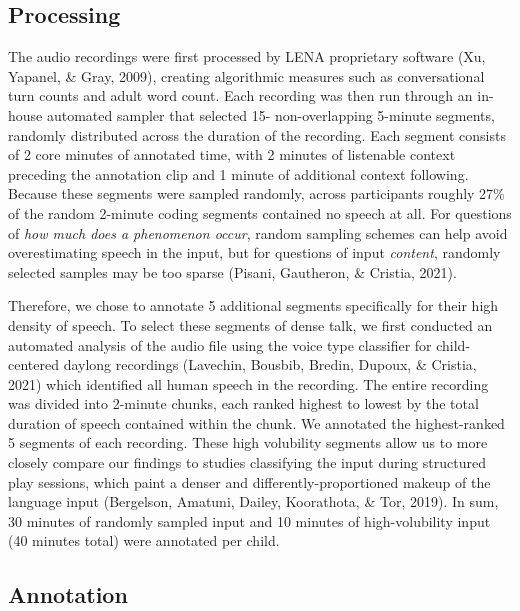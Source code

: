 \documentclass[
  man]{apa6}
\begin{document}
\hypertarget{processing}{%
\subsection{Processing}\label{processing}}

The audio recordings were first processed by LENA proprietary software (Xu, Yapanel, \& Gray, 2009), creating algorithmic measures such as conversational turn counts and adult word count. Each recording was then run through an in-house automated sampler that selected 15- non-overlapping 5-minute segments, randomly distributed across the duration of the recording. Each segment consists of 2 core minutes of annotated time, with 2 minutes of listenable context preceding the annotation clip and 1 minute of additional context following. Because these segments were sampled randomly, across participants roughly 27\% of the random 2-minute coding segments contained no speech at all. For questions of \emph{how much does a phenomenon occur}, random sampling schemes can help avoid overestimating speech in the input, but for questions of input \emph{content}, randomly selected samples may be too sparse (Pisani, Gautheron, \& Cristia, 2021).

Therefore, we chose to annotate 5 additional segments specifically for their high density of speech. To select these segments of dense talk, we first conducted an automated analysis of the audio file using the voice type classifier for child-centered daylong recordings (Lavechin, Bousbib, Bredin, Dupoux, \& Cristia, 2021) which identified all human speech in the recording. The entire recording was divided into 2-minute chunks, each ranked highest to lowest by the total duration of speech contained within the chunk. We annotated the highest-ranked 5 segments of each recording. These high volubility segments allow us to more closely compare our findings to studies classifying the input during structured play sessions, which paint a denser and differently-proportioned makeup of the language input (Bergelson, Amatuni, Dailey, Koorathota, \& Tor, 2019). In sum, 30 minutes of randomly sampled input and 10 minutes of high-volubility input (40 minutes total) were annotated per child.

\hypertarget{annotation}{%
\subsection{Annotation}\label{annotation}}
\end{document}
